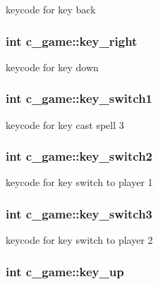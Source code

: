 keycode for key back \hypertarget{classc__game_af6dab00f73f4853063cc4bab0f57d14d}{
\subsubsection[{key\-\_\-right}]{\setlength{\rightskip}{0pt plus 5cm}int c\-\_\-game\-::key\-\_\-right\hspace{0.3cm}{\ttfamily [protected]}}}\label{classc__game_af6dab00f73f4853063cc4bab0f57d14d}
keycode for key down \hypertarget{classc__game_ab9067838b721c66b6f85405c42d97819}{
\subsubsection[{key\-\_\-switch1}]{\setlength{\rightskip}{0pt plus 5cm}int c\-\_\-game\-::key\-\_\-switch1\hspace{0.3cm}{\ttfamily [protected]}}}\label{classc__game_ab9067838b721c66b6f85405c42d97819}
keycode for key cast spell 3 \hypertarget{classc__game_a27d7c0789c4908c411476b0613a3077e}{
\subsubsection[{key\-\_\-switch2}]{\setlength{\rightskip}{0pt plus 5cm}int c\-\_\-game\-::key\-\_\-switch2\hspace{0.3cm}{\ttfamily [protected]}}}\label{classc__game_a27d7c0789c4908c411476b0613a3077e}
keycode for key switch to player 1 \hypertarget{classc__game_ab639463186d28277b420814ffed910e6}{
\subsubsection[{key\-\_\-switch3}]{\setlength{\rightskip}{0pt plus 5cm}int c\-\_\-game\-::key\-\_\-switch3\hspace{0.3cm}{\ttfamily [protected]}}}\label{classc__game_ab639463186d28277b420814ffed910e6}
keycode for key switch to player 2 \hypertarget{classc__game_afe75cb5007878208a9ba456438b1cd3e}{
\subsubsection[{key\-\_\-up}]{\setlength{\rightskip}{0pt plus 5cm}int c\-\_\-game\-::key\-\_\-up\hspace{0.3cm}{\ttfamily [protected]}}}\label{classc__game_afe75cb5007878208a9ba456438b1cd3e}
